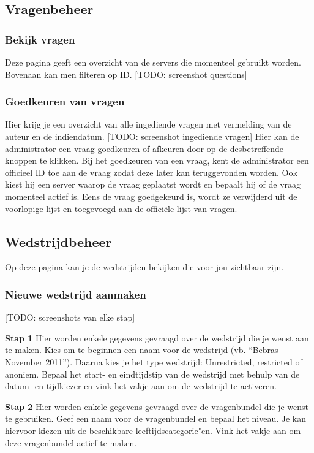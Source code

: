 \documentclass[]{article}
\begin{document}
\subsection{Vragenbeheer}

\subsubsection{Bekijk vragen}
Deze pagina geeft een overzicht van de servers die momenteel gebruikt worden. Bovenaan kan men filteren op ID. [TODO: screenshot questions]

\subsubsection{Goedkeuren van vragen}
Hier krijg je een overzicht van alle ingediende vragen met vermelding van de auteur en de indiendatum. [TODO: screenshot ingediende vragen] Hier kan de administrator een vraag goedkeuren of afkeuren door op de desbetreffende knoppen te klikken. Bij het goedkeuren van een vraag, kent de administrator een officieel ID toe aan de vraag zodat deze later kan teruggevonden worden. Ook kiest hij een server waarop de vraag geplaatst wordt en bepaalt hij of de vraag momenteel actief is. Eens de vraag goedgekeurd is, wordt ze verwijderd uit de voorlopige lijst en toegevoegd aan de officiële lijst van vragen.

\subsection{Wedstrijdbeheer}
Op deze pagina kan je de wedstrijden bekijken die voor jou zichtbaar zijn. 

\subsubsection{Nieuwe wedstrijd aanmaken}

[TODO: screenshots van elke stap]

\textbf{Stap 1}
Hier worden enkele gegevens gevraagd over de wedstrijd die je wenst aan te maken. 
Kies om te beginnen een naam voor de wedstrijd (vb. "`Bebras November 2011"'). Daarna kies je het type wedstrijd: Unrestricted, restricted of anoniem. Bepaal het start- en eindtijdstip van de wedstrijd met behulp van de datum- en tijdkiezer en vink het vakje aan om de wedstrijd te activeren.

\textbf{Stap 2}
Hier worden enkele gegevens gevraagd over de vragenbundel die je wenst te gebruiken. 
Geef een naam voor de vragenbundel en bepaal het niveau. Je kan hiervoor kiezen uit de beschikbare leeftijdscategorie"en. Vink het vakje aan om deze vragenbundel actief te maken.
\end{document}
